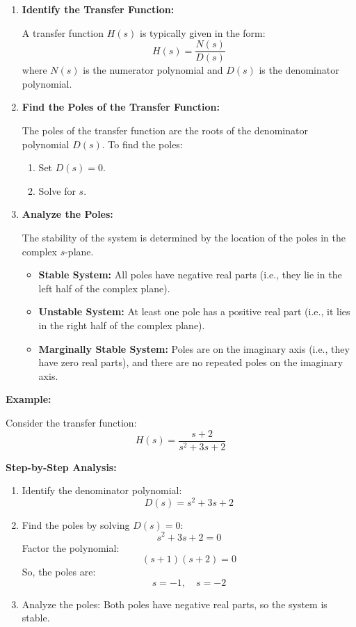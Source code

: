 \begin{enumerate}
    \item \textbf{Identify the Transfer Function:}

    A transfer function \( H(s) \) is typically given in the form:
    \[
    H(s) = \frac{N(s)}{D(s)}
    \]
    where \( N(s) \) is the numerator polynomial and \( D(s) \) is the denominator polynomial.
    
    \item \textbf{Find the Poles of the Transfer Function:}

    The poles of the transfer function are the roots of the denominator polynomial \( D(s) \). To find the poles:
    \begin{enumerate}
        \item Set \( D(s) = 0 \).
        \item Solve for \( s \).
    \end{enumerate}

    \item \textbf{Analyze the Poles:}

    The stability of the system is determined by the location of the poles in the complex \( s \)-plane.
    \begin{itemize}
        \item \textbf{Stable System:} All poles have negative real parts (i.e., they lie in the left half of the complex plane).
        \item \textbf{Unstable System:} At least one pole has a positive real part (i.e., it lies in the right half of the complex plane).
        \item \textbf{Marginally Stable System:} Poles are on the imaginary axis (i.e., they have zero real parts), and there are no repeated poles on the imaginary axis.
    \end{itemize}
\end{enumerate}

\textbf{Example:}

Consider the transfer function:
\[
H(s) = \frac{s + 2}{s^2 + 3s + 2}
\]

\textbf{Step-by-Step Analysis:}

\begin{enumerate}
    \item Identify the denominator polynomial:
    \[
    D(s) = s^2 + 3s + 2
    \]

    \item Find the poles by solving \( D(s) = 0 \):
    \[
    s^2 + 3s + 2 = 0
    \]
    Factor the polynomial:
    \[
    (s + 1)(s + 2) = 0
    \]
    So, the poles are:
    \[
    s = -1, \quad s = -2
    \]

    \item Analyze the poles:
    Both poles have negative real parts, so the system is stable.
\end{enumerate}

